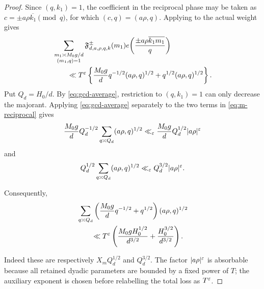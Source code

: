 \begin{proof}
Since $(q,k_1)=1$, the coefficient in the reciprocal phase may be taken as
$c=\pm a\rho\overline{k_1}\pmod q$, for which
$(c,q)=(a\rho,q)$.  Applying  to the actual weight
gives
\begin{align}
 &\sum_{\substack{m_1\asymp M_0g/d\\(m_1,q)=1}}
 \mathfrak F_{d,a,\rho,q,k}^{\pm}(m_1)
 e\!\left(\frac{\pm a\rho\overline{k_1m_1}}q\right)\notag\\
 &\qquad\ll T^\varepsilon
 \left\{
 \frac{M_0g}{d}q^{-1/2}(a\rho,q)^{1/2}
 +q^{1/2}(a\rho,q)^{1/2}
 \right\}.
 \label{eq:m-reciprocal}
\end{align}
Put $Q_d=H_0/d$.  By \eqref{eq:gcd-average}, restriction to
$(q,k_1)=1$ can only decrease the majorant.  Applying
\eqref{eq:gcd-average} separately to the two terms in
\eqref{eq:m-reciprocal} gives
\[
 \frac{M_0g}{d}Q_d^{-1/2}
 \sum_{q\asymp Q_d}(a\rho,q)^{1/2}
 \ll_\varepsilon \frac{M_0g}{d}Q_d^{1/2}|a\rho|^\varepsilon
\]
and
\[
 Q_d^{1/2}\sum_{q\asymp Q_d}(a\rho,q)^{1/2}
 \ll_\varepsilon Q_d^{3/2}|a\rho|^\varepsilon.
\]
\begin{samepage}
Consequently,
\begin{align}
 &\sum_{q\asymp Q_d}
 \left(\frac{M_0g}{d}q^{-1/2}+q^{1/2}\right)
 (a\rho,q)^{1/2}\notag\\
 &\qquad\ll T^\varepsilon
 \left(\frac{M_0gH_0^{1/2}}{d^{3/2}}
       +\frac{H_0^{3/2}}{d^{3/2}}\right).
 \label{eq:completed-q-sum}
\end{align}
\end{samepage}
Indeed these are respectively $X_mQ_d^{1/2}$ and $Q_d^{3/2}$.
The factor $|a\rho|^\varepsilon$ is absorbable because all retained dyadic
parameters are bounded by a fixed power of $T$; the auxiliary exponent is
chosen before relabelling the total loss as $T^\varepsilon$.


\end{proof}
